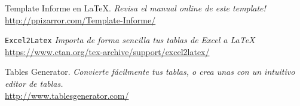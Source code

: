 \newpage
\begin{thebibliography}{}
	
		Template Informe en \LaTeX.
		\textit{Revisa el manual online de este template!}
		\\\url{http://ppizarror.com/Template-Informe/}
		
		\texttt{Excel2Latex}
		\textit{Importa de forma sencilla tus tablas de Excel a \LaTeX}
		\\\url{https://www.ctan.org/tex-archive/support/excel2latex/}
		
		Tables Generator.
		\textit{Convierte fácilmente tus tablas, o crea unas con un intuitivo editor de tablas.}
		\\\url{http://www.tablesgenerator.com/}
	
\end{thebibliography}